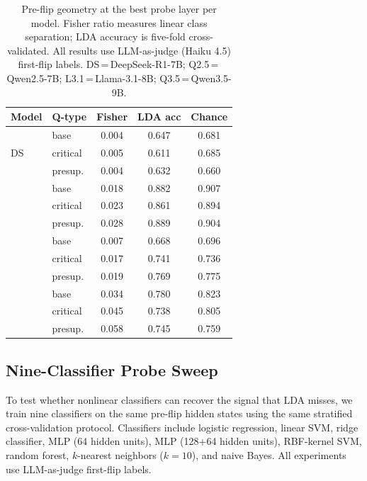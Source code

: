 \documentclass[11pt]{article}
\begin{document}
 \begin{table}[t]
  \centering
  \small
  \setlength{\tabcolsep}{4pt}
  \caption{Pre-flip geometry at the best probe layer per model. Fisher ratio
    measures linear class separation; LDA accuracy is five-fold cross-validated.
    All results use LLM-as-judge (Haiku 4.5) first-flip labels.
    DS\,=\,DeepSeek-R1-7B; Q2.5\,=\,Qwen2.5-7B;
    L3.1\,=\,Llama-3.1-8B; Q3.5\,=\,Qwen3.5-9B.}
  \label{tab:geometry}
  \begin{tabular}{@{}lp{1.3cm}ccc@{}}
  \toprule
  Model & Q-type & Fisher & LDA acc & Chance \\
  \midrule
  \multirow{3}{*}{DS}
    & base       & 0.004 & 0.647 & 0.681 \\
    & critical   & 0.005 & 0.611 & 0.685 \\
    & presup.    & 0.004 & 0.632 & 0.660 \\
  \addlinespace
  \multirow{3}{*}{Q2.5}
    & base       & 0.018 & 0.882 & 0.907 \\
    & critical   & 0.023 & 0.861 & 0.894 \\
    & presup.    & 0.028 & 0.889 & 0.904 \\
  \addlinespace
  \multirow{3}{*}{L3.1}
    & base       & 0.007 & 0.668 & 0.696 \\
    & critical   & 0.017 & 0.741 & 0.736 \\
    & presup.    & 0.019 & 0.769 & 0.775 \\
  \addlinespace
  \multirow{3}{*}{Q3.5}
    & base       & 0.034 & 0.780 & 0.823 \\
    & critical   & 0.045 & 0.738 & 0.805 \\
    & presup.    & 0.058 & 0.745 & 0.759 \\
  \bottomrule
  \end{tabular}
  \end{table}
  
  \subsection{Nine-Classifier Probe Sweep}
  \label{sec:sweep}

  To test whether nonlinear classifiers can recover the signal that LDA misses,
  we train nine classifiers on the same pre-flip hidden states using the same
  stratified cross-validation protocol. Classifiers include logistic regression,
  linear SVM, ridge classifier, MLP (64 hidden units), MLP (128+64 hidden units),
  RBF-kernel SVM, random forest, $k$-nearest neighbors ($k=10$), and naive Bayes.
  All experiments use LLM-as-judge first-flip labels.
\end{document}
